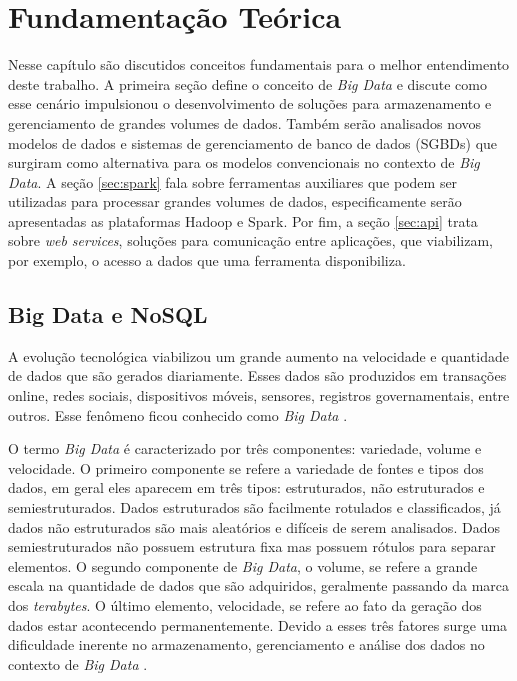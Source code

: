 
\chapter{Fundamentação Teórica}
\label{chap:fundamentacaoTeorica}

Nesse capítulo são discutidos conceitos fundamentais para o melhor entendimento deste 
trabalho. A primeira seção define o conceito de \textit{Big Data} e discute como esse 
cenário impulsionou o desenvolvimento de soluções para armazenamento e gerenciamento de 
grandes volumes de dados. Também serão analisados novos modelos de dados e sistemas de 
gerenciamento de banco de dados (SGBDs) que surgiram como alternativa para os modelos 
convencionais no contexto de \textit{Big Data}. A seção \ref{sec:spark} fala 
sobre ferramentas auxiliares que podem ser utilizadas para processar grandes volumes de dados,
especificamente serão apresentadas as plataformas Hadoop e Spark. Por fim, a seção 
\ref{sec:api} trata sobre \textit{web services}, soluções para comunicação entre aplicações, 
que viabilizam, por exemplo, o acesso a dados que uma ferramenta disponibiliza.

\section{Big Data e NoSQL}
\label{sec:bigdata}

A evolução tecnológica viabilizou um grande aumento na velocidade e quantidade de dados que 
são gerados diariamente. Esses dados são produzidos em transações online, redes sociais, 
dispositivos móveis, sensores, registros governamentais, entre outros. Esse fenômeno ficou 
conhecido como \textit{Big Data} \cite{sagiroglu2013big}. 

O termo \textit{Big Data} é caracterizado por três componentes: variedade, volume e velocidade. 
O primeiro componente se refere a variedade de fontes e tipos dos dados, em geral eles 
aparecem em três tipos: estruturados, não estruturados e semiestruturados. Dados estruturados 
são facilmente rotulados e classificados, já dados não estruturados são mais aleatórios e 
difíceis de serem analisados. Dados semiestruturados não possuem estrutura fixa mas possuem 
rótulos para separar elementos. O segundo componente de \textit{Big Data}, o volume, se 
refere a grande escala na quantidade de dados que são adquiridos, geralmente passando da 
marca dos \textit{terabytes}. O último elemento, velocidade, se refere ao fato da geração 
dos dados estar acontecendo permanentemente. Devido a esses três fatores surge uma 
dificuldade inerente no armazenamento, gerenciamento e análise dos dados no contexto de 
\textit{Big Data} \cite{sagiroglu2013big}.

